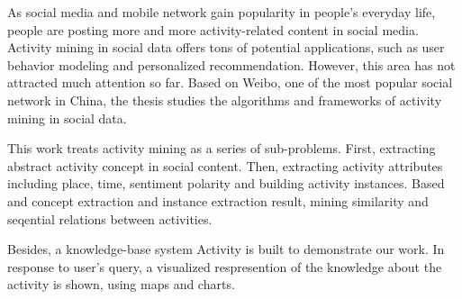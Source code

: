 
\begin{eabstract} 
As social media and mobile network gain popularity in people's everyday life, people are posting more and more activity-related content in social media. Activity mining in social data offers tons of potential applications, such as user behavior modeling and personalized recommendation. However, this area has not attracted much attention so far. Based on Weibo, one of the most popular social network in China, the thesis studies the algorithms and frameworks of activity mining in social data.

This work treats activity mining as a series of sub-problems. First, extracting abstract activity concept in social content. Then, extracting activity attributes including place, time, sentiment polarity and building activity instances. Based and concept extraction and instance extraction result, mining similarity and seqential relations between activities.

Besides, a knowledge-base system Activity is built to demonstrate our work. In response to user's query, a visualized respresention of the knowledge about the activity is shown, using maps and charts.
\end{eabstract}


